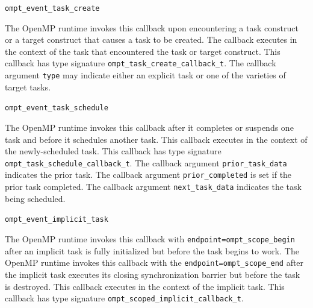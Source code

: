 \documentclass{article}
\newcommand{\descheader}[1]{{\needspace{3\baselineskip}\vspace{1em}\noindent \fbox{#1}}}
\begin{document}
\begin{description}

\item \verb|ompt_event_task_create|
 
The OpenMP runtime invokes this callback
upon encountering a task construct or a target construct that causes a task to be created. 
The callback executes in the context of
the task that encountered the task or target construct.
This callback has type signature \verb|ompt_task_create_callback_t|.
The callback argument \verb|type| may indicate either an explicit task or one of the varieties of target tasks.

\item \verb|ompt_event_task_schedule|

 The OpenMP runtime invokes this callback after it
 completes or suspends one task and before it schedules another task.  This
 callback executes in the context of the newly-scheduled task.  
   This callback has type signature \verb|ompt_task_schedule_callback_t|. 
  The callback argument \verb|prior_task_data| indicates the prior task.
  The callback argument \verb|prior_completed| is set if the prior task completed.
  The callback argument \verb|next_task_data| indicates the task being scheduled. 

\item \verb|ompt_event_implicit_task|

      The OpenMP runtime invokes this callback with \verb|endpoint=|\verb|ompt_scope_begin| after an
   implicit task is fully initialized but before the task begins to work.
   The OpenMP runtime invokes this callback with the \verb|endpoint=|\verb|ompt_scope_end| after the implicit
   task executes its closing synchronization barrier but before
   the task is destroyed.
   This callback executes in the context of the implicit task.
     This callback has type signature \verb|ompt_scoped_implicit_callback_t|. 
   
\end{description}

\descheader{Target Regions}
\end{document}
